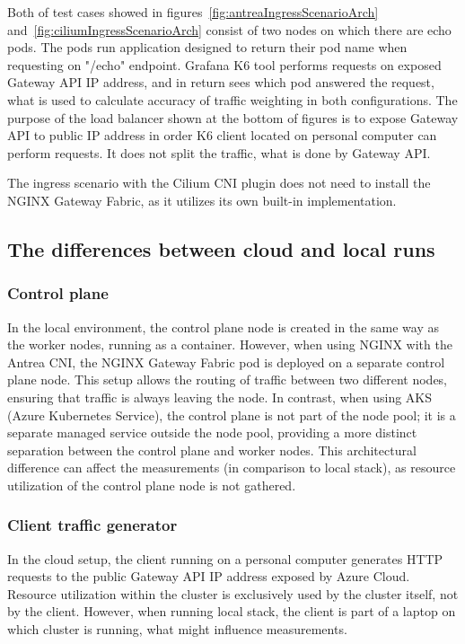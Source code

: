Both of test cases showed in figures~\ref{fig:antreaIngressScenarioArch} and~\ref{fig:ciliumIngressScenarioArch} consist of two nodes on which there are echo pods. The pods run application designed to return their pod name when requesting on "/echo" endpoint. Grafana K6 tool performs requests on exposed Gateway API IP address, and in return sees which pod answered the request, what is used to calculate accuracy of traffic weighting in both configurations. The purpose of the load balancer shown at the bottom of figures is to expose Gateway API to public IP address in order K6 client located on personal computer can perform requests. It does not split the traffic, what is done by Gateway API. 

The ingress scenario with the Cilium CNI plugin does not need to install the NGINX Gateway Fabric, as it utilizes its own built-in implementation. 


\subsection{The differences between cloud and local runs}
\label{sec:diff}

\subsubsection{Control plane}
\label{sec:cplaneDiff}

In the local environment, the control plane node is created in the same way as the worker nodes, running as a container. However, when using NGINX with the Antrea CNI, the NGINX Gateway Fabric pod is deployed on a separate control plane node. This setup allows the routing of traffic between two different nodes, ensuring that traffic is always leaving the node. In contrast, when using AKS (Azure Kubernetes Service), the control plane is not part of the node pool; it is a separate managed service outside the node pool, providing a more distinct separation between the control plane and worker nodes. This architectural difference can affect the measurements (in comparison to local stack), as resource utilization of the control plane node is not gathered.

\subsubsection{Client traffic generator}
\label{sec:clientServerDiff}

In the cloud setup, the client running on a personal computer generates HTTP requests to the public Gateway API IP address exposed by Azure Cloud. Resource utilization within the cluster is exclusively used by the cluster itself, not by the client. However, when running local stack, the client is part of a laptop on which cluster is running, what might influence measurements.
